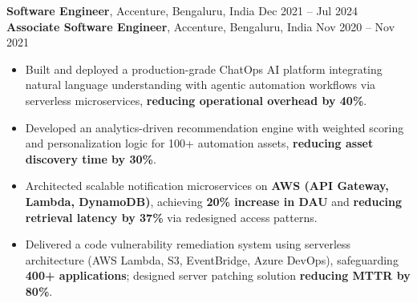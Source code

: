 \documentclass[letterpaper,10.5pt]{extarticle}
\begin{document}
\noindent\textbf{Software Engineer}, Accenture, Bengaluru, India \hfill Dec 2021 -- Jul 2024\\
\textbf{Associate Software Engineer}, Accenture, Bengaluru, India \hfill Nov 2020 -- Nov 2021

\begin{itemize}[leftmargin=12pt, topsep=1pt, itemsep=0pt, parsep=0pt]
    \item Built and deployed a production-grade ChatOps AI platform integrating natural language understanding with agentic automation workflows via serverless microservices, \textbf{reducing operational overhead by 40\%}.
    \item Developed an analytics-driven recommendation engine with weighted scoring and personalization logic for 100+ automation assets, \textbf{reducing asset discovery time by 30\%}.
    \item Architected scalable notification microservices on \textbf{AWS (API Gateway, Lambda, DynamoDB)}, achieving \textbf{20\% increase in DAU} and \textbf{reducing retrieval latency by 37\%} via redesigned access patterns.
    \item Delivered a code vulnerability remediation system using serverless architecture (AWS Lambda, S3, EventBridge, Azure DevOps), safeguarding \textbf{400+ applications}; designed server patching solution \textbf{reducing MTTR by 80\%}.
\end{itemize}
\end{document}
